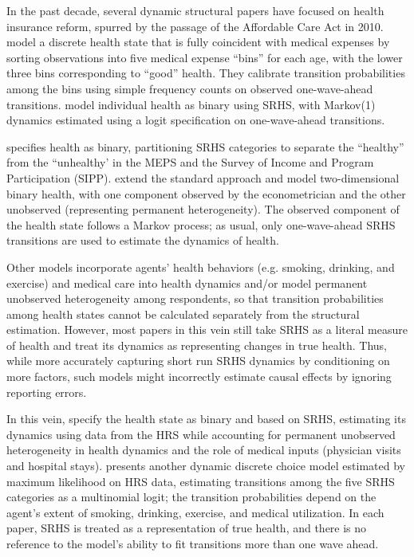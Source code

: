 \documentclass[12pt,pdftex,letterpaper]{article}
\begin{document}
In the past decade, several dynamic structural papers have focused on health insurance reform, spurred by the passage of the Affordable Care Act in 2010. \cite{Pashchenko13} model a discrete health state that is fully coincident with medical expenses by sorting observations into five medical expense ``bins'' for each age, with the lower three bins corresponding to ``good'' health. They calibrate transition probabilities among the bins using simple frequency counts on observed one-wave-ahead transitions. \cite{Ferreira17} model individual health as binary using SRHS, with Markov(1) dynamics estimated using a logit specification on one-wave-ahead transitions. 

\cite{Aizawa19} specifies health as binary, partitioning SRHS categories to separate the ``healthy'' from the ``unhealthy' in the MEPS and the Survey of Income and Program Participation (SIPP). \cite{AizawaFang20} extend the standard approach and model two-dimensional binary health, with one component observed by the econometrician and the other unobserved (representing permanent heterogeneity). The observed component of the health state follows a Markov process; as usual, only one-wave-ahead SRHS transitions are used to estimate the dynamics of health.

Other models incorporate agents' health behaviors (e.g. smoking, drinking, and exercise) and medical care into health dynamics and/or model permanent unobserved heterogeneity among respondents, so that transition probabilities among health states cannot be calculated separately from the structural estimation. However, most papers in this vein still take SRHS as a literal measure of health and treat its dynamics as representing changes in true health. Thus, while more accurately capturing short run SRHS dynamics by conditioning on more factors, such models might incorrectly estimate causal effects by ignoring reporting errors.

In this vein, \cite{BlauGilleskie08} specify the health state as binary and based on SRHS, estimating its dynamics using data from the HRS while accounting for permanent unobserved heterogeneity in health dynamics and the role of medical inputs (physician visits and hospital stays). \cite{Khwaja10} presents another dynamic discrete choice model estimated by maximum likelihood on HRS data, estimating transitions among the five SRHS categories as a multinomial logit; the transition probabilities depend on the agent's extent of smoking, drinking, exercise, and medical utilization. In each paper, SRHS is treated as a representation of true health, and there is no reference to the model's ability to fit transitions more than one wave ahead.
\end{document}
